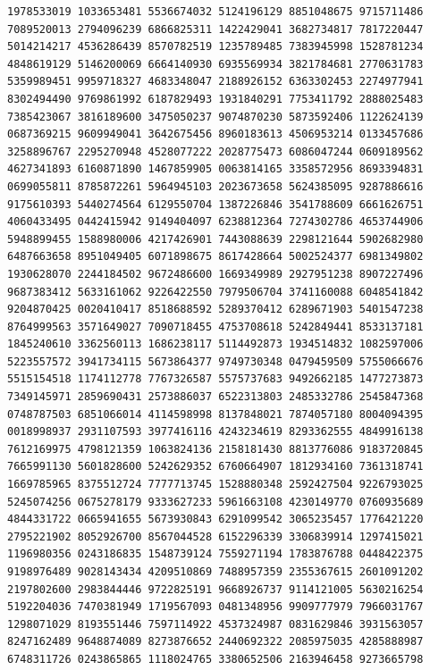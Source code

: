 \begin{Verbatim}[fontsize=\fontsize{6.4}{7.3}\selectfont]
1978533019 1033653481 5536674032 5124196129 8851048675 9715711486 7089520013 2794096239 6866825311 1422429041 3682734817 7817220447
5014214217 4536286439 8570782519 1235789485 7383945998 1528781234 4848619129 5146200069 6664140930 6935569934 3821784681 2770631783
5359989451 9959718327 4683348047 2188926152 6363302453 2274977941 8302494490 9769861992 6187829493 1931840291 7753411792 2888025483
7385423067 3816189600 3475050237 9074870230 5873592406 1122624139 0687369215 9609949041 3642675456 8960183613 4506953214 0133457686
3258896767 2295270948 4528077222 2028775473 6086047244 0609189562 4627341893 6160871890 1467859905 0063814165 3358572956 8693394831
0699055811 8785872261 5964945103 2023673658 5624385095 9287886616 9175610393 5440274564 6129550704 1387226846 3541788609 6661626751
4060433495 0442415942 9149404097 6238812364 7274302786 4653744906 5948899455 1588980006 4217426901 7443088639 2298121644 5902682980
6487663658 8951049405 6071898675 8617428664 5002524377 6981349802 1930628070 2244184502 9672486600 1669349989 2927951238 8907227496
9687383412 5633161062 9226422550 7979506704 3741160088 6048541842 9204870425 0020410417 8518688592 5289370412 6289671903 5401547238
8764999563 3571649027 7090718455 4753708618 5242849441 8533137181 1845240610 3362560113 1686238117 5114492873 1934514832 1082597006
5223557572 3941734115 5673864377 9749730348 0479459509 5755066676 5515154518 1174112778 7767326587 5575737683 9492662185 1477273873
7349145971 2859690431 2573886037 6522313803 2485332786 2545847368 0748787503 6851066014 4114598998 8137848021 7874057180 8004094395
0018998937 2931107593 3977416116 4243234619 8293362555 4849916138 7612169975 4798121359 1063824136 2158181430 8813776086 9183720845
7665991130 5601828600 5242629352 6760664907 1812934160 7361318741 1669785965 8375512724 7777713745 1528880348 2592427504 9226793025
5245074256 0675278179 9333627233 5961663108 4230149770 0760935689 4844331722 0665941655 5673930843 6291099542 3065235457 1776421220
2795221902 8052926700 8567044528 6152296339 3306839914 1297415021 1196980356 0243186835 1548739124 7559271194 1783876788 0448422375
9198976489 9028143434 4209510869 7488957359 2355367615 2601091202 2197802600 2983844446 9722825191 9668926737 9114121005 5630216254
5192204036 7470381949 1719567093 0481348956 9909777979 7966031767 1298071029 8193551446 7597114922 4537324987 0831629846 3931563057
8247162489 9648874089 8273876652 2440692322 2085975035 4285888987 6748311726 0243865865 1118024765 3380652506 2163946458 9273665798

\end{Verbatim}
